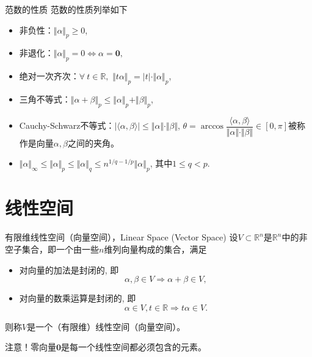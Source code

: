 \begin{frame}

\begin{block}{范数的性质}
范数的性质列举如下
\begin{itemize}
\item 非负性：$\Vert \alpha \Vert_p \geqslant 0$,
\item 非退化：$\Vert \alpha \Vert_p = 0 \Longleftrightarrow \alpha = \mathbf{0},$
\item 绝对一次齐次：$\forall~t\in\mathbb{R},$ $\Vert t\alpha \Vert_p = |t|\cdot\Vert \alpha \Vert_p$,
\item 三角不等式：$\Vert \alpha + \beta \Vert_p \leqslant \Vert \alpha \Vert_p + \Vert \beta \Vert_p$,
\item Cauchy-Schwarz不等式：$|\langle \alpha, \beta \rangle| \leqslant \Vert \alpha \Vert \cdot \Vert \beta \Vert$,\newline
$\theta = \arccos \dfrac{\langle \alpha, \beta \rangle}{\Vert \alpha \Vert \cdot \Vert \beta \Vert} \in [0, \pi]$被称作是向量$\alpha, \beta$之间的夹角。
\end{itemize}
\end{block}

\vspace{1em}
\pause

\begin{itemize}
\color{zkblue!50}
\item $\Vert \alpha \Vert_{\infty} \leqslant \Vert \alpha \Vert_p \leqslant \Vert \alpha \Vert_q \leqslant n^{1/q - 1/p}\Vert \alpha \Vert_p$, 其中$1\leqslant q < p$.
\end{itemize}

\end{frame}


\section{线性空间}


\begin{frame}

\begin{block}{有限维线性空间（向量空间），Linear Space (Vector Space)}
设$V \subset \mathbb{R}^n$是$\mathbb{R}^n$中的非空子集合，即一个由一些$n$维列向量构成的集合，满足
\begin{itemize}
\item 对向量的加法是封闭的, 即
\[\alpha, \beta \in V \Longrightarrow \alpha + \beta \in V,\]
\item 对向量的数乘运算是封闭的, 即
\[\alpha \in V, t \in \mathbb{R} \Longrightarrow t\alpha \in V.\]
\end{itemize}
则称$V$是一个（有限维）线性空间（向量空间）。
\end{block}

{\color{red}注意！}零向量$\mathbf{0}$是每一个线性空间都必须包含的元素。

\end{frame}

